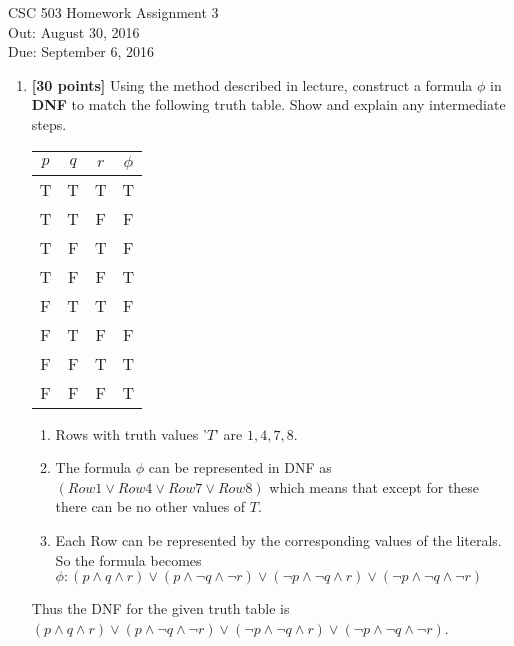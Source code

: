\documentclass{article}
\begin{document}
\begin{center}
  {\LARGE CSC 503 Homework Assignment 3}\\[1pc]
  Out: August 30, 2016 \\
  Due: September 6, 2016 \\
\end{center}

\begin{enumerate}

\item \textbf{[30 points]} Using the method described in lecture,
  construct a formula $\phi$ in \textbf{DNF} to match the following
  truth table.  Show and explain any intermediate steps.
  \begin{center}
    \begin{tabular}{ccc|c}
      $p$ & $q$ & $r$ & $\phi$ \\ \hline
      T & T & T & T\\
      T & T & F & F\\
      T & F & T & F\\
      T & F & F & T\\
      F & T & T & F\\
      F & T & F & F\\
      F & F & T & T\\
      F & F & F & T
    \end{tabular}
  \end{center}
  
  \begin{answer}
  	\begin{enumerate}
  	  \item Rows with truth values '$T$' are $1, 4, 7, 8$.
  	  \item The formula $\phi$ can be represented in DNF as $(Row1 \lor Row4 \lor
  	  Row7 \lor Row8)$ which means that except for these there can be no other values of $T$.
  	  \item Each Row can be represented by the corresponding values of the
  	  literals. So the formula becomes $\phi : (p \land q \land r) \lor ( p
  	  \land \neg q\land \neg r) \lor (\neg p \land \neg q \land r) \lor (\neg p \land \neg q \land \neg r) $
	\end{enumerate}
	
	Thus the DNF for the given truth table is $(p \land q \land r) \lor ( p
  	  \land \neg q\land \neg r) \lor (\neg p \land \neg q \land r) \lor (\neg p \land \neg q \land \neg r)$.
  \end{answer}


\end{enumerate}
\end{document}
